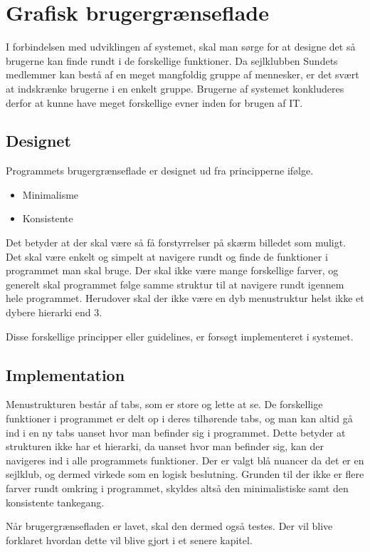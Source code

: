 \chapter{Grafisk brugergrænseflade} \label{chap:GUI}

I forbindelsen med udviklingen af systemet, skal man sørge for at designe det så brugerne kan finde rundt i de forskellige funktioner. Da sejlklubben Sundets medlemmer kan bestå af en meget mangfoldig gruppe af mennesker, er det svært at indskrænke brugerne i en enkelt gruppe. Brugerne af systemet konkluderes derfor at kunne have meget forskellige evner inden for brugen af IT.

\section{Designet} \label{sec:Designet}

Programmets brugergrænseflade er designet ud fra principperne ifølge. \citep{gui1} 

\begin{itemize}
	\item Minimalisme
	\item Konsistente
\end{itemize}

Det betyder at der skal være så få forstyrrelser på skærm billedet som muligt. Det skal være enkelt og simpelt at navigere rundt og finde de funktioner i programmet man skal bruge. Der skal ikke være mange forskellige farver, og generelt skal programmet følge samme struktur til at navigere rundt igennem hele programmet. Herudover skal der ikke være en dyb menustruktur helst ikke et dybere hierarki end 3.

Disse forskellige principper eller guidelines, er forsøgt implementeret i systemet.

\section{Implementation}\label{sec:Implementation}

Menustrukturen består af tabs, som er store og lette at se. De forskellige funktioner i programmet er delt op i deres tilhørende tabs, og man kan altid gå ind i en ny tabs uanset hvor man befinder sig i programmet. Dette betyder at strukturen ikke har et hierarki, da uanset hvor man befinder sig, kan der navigeres ind i alle programmets funktioner. Der er valgt blå nuancer da det er en sejlklub, og dermed virkede som en logisk beslutning. Grunden til der ikke er flere farver rundt omkring i programmet, skyldes altså den minimalistiske samt den konsistente tankegang.


Når brugergrænsefladen er lavet, skal den dermed også testes. Der vil blive forklaret hvordan dette vil blive gjort i et senere kapitel. 